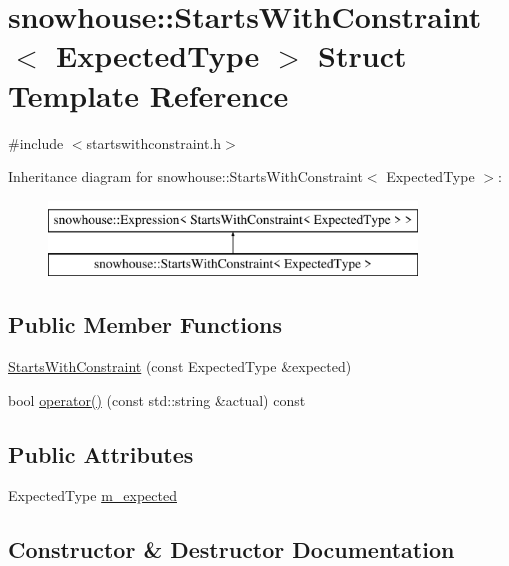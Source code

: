 \hypertarget{structsnowhouse_1_1StartsWithConstraint}{}\section{snowhouse\+::Starts\+With\+Constraint$<$ Expected\+Type $>$ Struct Template Reference}
\label{structsnowhouse_1_1StartsWithConstraint}


{\ttfamily \#include $<$startswithconstraint.\+h$>$}

Inheritance diagram for snowhouse\+::Starts\+With\+Constraint$<$ Expected\+Type $>$\+:\begin{figure}[H]
\begin{center}
\leavevmode
\includegraphics[height=2.000000cm]{structsnowhouse_1_1StartsWithConstraint}
\end{center}
\end{figure}
\subsection*{Public Member Functions}
\begin{DoxyCompactItemize}
\item 
\mbox{\hyperlink{structsnowhouse_1_1StartsWithConstraint_a1142e056ba0c11ec4b265a3a4a5ca0d4}{Starts\+With\+Constraint}} (const Expected\+Type \&expected)
\item 
bool \mbox{\hyperlink{structsnowhouse_1_1StartsWithConstraint_a354ad0f942acf22874b367bc01ae9531}{operator()}} (const std\+::string \&actual) const
\end{DoxyCompactItemize}
\subsection*{Public Attributes}
\begin{DoxyCompactItemize}
\item 
Expected\+Type \mbox{\hyperlink{structsnowhouse_1_1StartsWithConstraint_a5ed40c137612f3b214948d93dc6feaa5}{m\+\_\+expected}}
\end{DoxyCompactItemize}


\subsection{Constructor \& Destructor Documentation}
\mbox{\label{structsnowhouse_1_1StartsWithConstraint_a1142e056ba0c11ec4b265a3a4a5ca0d4}} 

